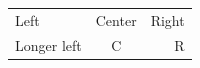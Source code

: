\documentclass{article}
\begin{document}
\begin{tabular}{lcr}
Left & Center & Right \\
Longer left & C & R
\end{tabular}
\end{document}
